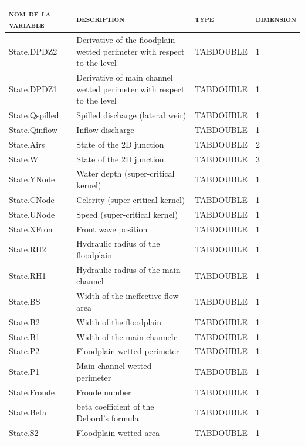 \documentclass[a4paper,11pt]{article}
\begin{document}
\begin{landscape}
\begin{table}[ht]
\begin{center}
\begin{tabular}{|l|l|l|l|}
\hline \textsc{nom de la variable} & \textsc{description} & \textsc{type} & \textsc{dimension} \\ 
\hline  State.DPDZ2 & Derivative of the floodplain wetted perimeter with respect to the level & TABDOUBLE & 1 \\
\hline  State.DPDZ1 & Derivative of main channel wetted perimeter with respect to the level & TABDOUBLE & 1 \\
\hline  State.Qspilled & Spilled discharge (lateral weir) & TABDOUBLE & 1 \\
\hline  State.Qinflow & Inflow discharge & TABDOUBLE & 1 \\
\hline  State.Airs & State of the 2D junction & TABDOUBLE & 2 \\
\hline  State.W & State of the 2D junction & TABDOUBLE & 3 \\
\hline  State.YNode & Water depth (super-critical kernel) & TABDOUBLE & 1 \\
\hline  State.CNode & Celerity (super-critical kernel) & TABDOUBLE & 1 \\
\hline  State.UNode & Speed (super-critical kernel) & TABDOUBLE & 1 \\
\hline  State.XFron & Front wave position & TABDOUBLE & 1 \\
\hline  State.RH2 & Hydraulic radius of the floodplain & TABDOUBLE & 1 \\
\hline  State.RH1 & Hydraulic radius of the main channel & TABDOUBLE & 1 \\
\hline  State.BS & Width of the ineffective flow area & TABDOUBLE & 1 \\
\hline  State.B2 & Width of the floodplain & TABDOUBLE & 1 \\
\hline  State.B1 & Width of the main channelr & TABDOUBLE & 1 \\
\hline  State.P2 & Floodplain wetted perimeter & TABDOUBLE & 1 \\
\hline  State.P1 & Main channel wetted perimeter & TABDOUBLE & 1 \\
\hline  State.Froude & Froude number & TABDOUBLE & 1 \\
\hline  State.Beta & beta coefficient of the Debord's formula & TABDOUBLE & 1 \\
\hline  State.S2 & Floodplain wetted area & TABDOUBLE & 1 \\

\end{tabular}
\end{center}
\end{table}
\end{landscape}
\end{document}

